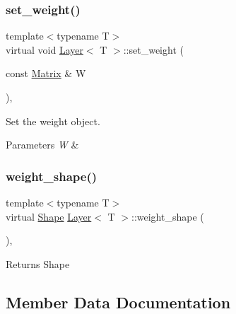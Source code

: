 \subsubsection{\texorpdfstring{set\_weight()}{set\_weight()}}
{\footnotesize\ttfamily template$<$typename T$>$ \\
virtual void \mbox{\hyperlink{class_layer}{Layer}}$<$ T $>$\+::set\+\_\+weight (\begin{DoxyParamCaption}\item[{const \mbox{\hyperlink{class_layer_a22b1e7286096aa62bd245536c8ebdaf1}{Matrix}} \&}]{W }\end{DoxyParamCaption})\hspace{0.3cm}{\ttfamily [inline]}, {\ttfamily [virtual]}}



Set the weight object. 


\begin{DoxyParams}{Parameters}
{\em W} & \\
\hline
\end{DoxyParams}
\mbox{\label{class_layer_afa0ec609fc7ef0053a362ea54d0f6f78}} 
\subsubsection{\texorpdfstring{weight\_shape()}{weight\_shape()}}
{\footnotesize\ttfamily template$<$typename T$>$ \\
virtual \mbox{\hyperlink{class_layer_a8313f42d2292d12dd5d40cc115636693}{Shape}} \mbox{\hyperlink{class_layer}{Layer}}$<$ T $>$\+::weight\+\_\+shape (\begin{DoxyParamCaption}{ }\end{DoxyParamCaption})\hspace{0.3cm}{\ttfamily [inline]}, {\ttfamily [virtual]}}

\begin{DoxyReturn}{Returns}
Shape 
\end{DoxyReturn}


\subsection{Member Data Documentation}
\mbox{\label{class_layer_ab200edbfbb0a0a7ee305d1371feb2815}} 
